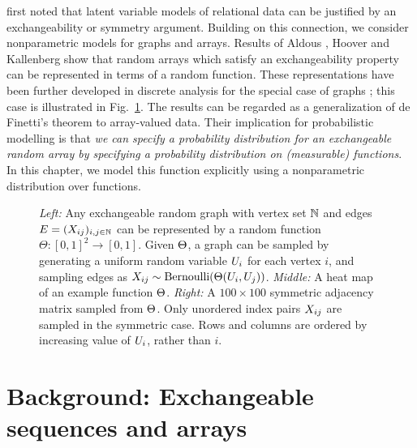 \citet{Hoff2007-ja} first noted that latent variable models of relational data can be justified by an exchangeability or symmetry argument.
Building on this connection, we consider nonparametric models for graphs and arrays.
Results of
Aldous \cite{Aldous1981-lg}, Hoover \cite{Hoover1979-br} and Kallenberg \cite{Kallenberg1992-gb} show
that random arrays which satisfy an exchangeability property can be represented in terms of a random
function. These representations have been further developed in discrete analysis for the
special case of graphs \citep{Lovasz2006-hc}; this case is illustrated in Fig.~\ref{fig:W:graph}.
The results can be regarded as a generalization of de Finetti's theorem to array-valued data.
Their implication for probabilistic modelling is that
\emph{we can specify a probability distribution for an exchangeable random array by specifying a probability distribution on (measurable) functions}.
In this chapter, we model this function explicitly using a nonparametric distribution over functions.

\begin{figure}
 \begin{center}
    
  \end{center}
 \caption{\emph{Left:} Any exchangeable random graph with vertex set $\mathbb{N}$ and edges ${E=(X_{ij})_{i,j\in\mathbb{N}}}$ can be represented
   by a random function ${\Theta:[0,1]^2\rightarrow[0,1]}$. Given $\Theta$, a graph can be sampled by generating a uniform random 
   variable $U_i$ for each vertex $i$, and sampling edges as ${X_{ij}\sim\mbox{\rm Bernoulli}(\Theta(U_i,U_j))}$.
   \emph{Middle:} A heat map of an example function $\Theta$.
   \emph{Right:} A ${100\times 100}$ symmetric adjacency matrix sampled from $\Theta$.
   Only unordered index pairs $X_{ij}$ are sampled in the symmetric case. Rows and columns are ordered
   by increasing value of $U_i$, rather than $i$.}
 \label{fig:W:graph}
\end{figure}


\section{Background: Exchangeable sequences and arrays}
\label{sec:background}

